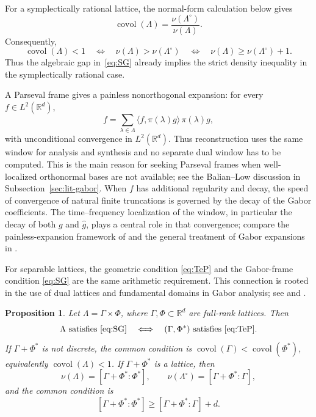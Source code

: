 \documentclass[11pt,reqno]{amsart}
\numberwithin{equation}{section}
\newtheorem{proposition}[theorem]{Proposition}
\theoremstyle{definition}
\theoremstyle{remark}
\newcommand{\R}{\mathbb R}
\newcommand{\covol}{\operatorname{covol}}
\newcommand{\ip}[2]{\langle #1,#2\rangle}
\begin{document}
For a symplectically rational lattice, the normal-form calculation below gives
\begin{equation}\label{eq:covol-nu-ratio-intro}
 \covol(\Lambda)=\frac{\nu(\Lambda^\circ)}{\nu(\Lambda)}.
\end{equation}
Consequently,
\[
 \covol(\Lambda)<1
 \quad\Longleftrightarrow\quad
 \nu(\Lambda)>\nu(\Lambda^\circ)
 \quad\Longleftrightarrow\quad
 \nu(\Lambda)\ge\nu(\Lambda^\circ)+1.
\]
Thus the algebraic gap in~\eqref{eq:SG} already implies the strict density
inequality in the symplectically rational case.

\medskip
A Parseval frame gives a painless nonorthogonal expansion: for every
$f\in L^2(\R^d)$,
\[
 f=\sum_{\lambda\in\Lambda}
     \ip{f}{\pi(\lambda)g}\,\pi(\lambda)g,
\]
with unconditional convergence in $L^2(\R^d)$.  Thus reconstruction uses
the same window for analysis and synthesis and no
separate dual window has to be computed.  This is the main reason for seeking Parseval frames when well-localized orthonormal bases are not available; see the Balian--Low discussion in Subsection~\ref{sec:lit-gabor}.  When $f$ has additional regularity and decay, the speed of
convergence of natural finite truncations is governed by the decay of the
Gabor coefficients.  The time--frequency localization of the window, in
particular the decay of both $g$ and $\widehat g$, plays a central role in
that convergence; compare the painless-expansion framework of
\cite{DaubechiesGrossmannMeyer1986} and the general treatment of Gabor
expansions in \cite[Chapters~5--7]{Grochenig2001}.
\medskip

For separable lattices, the geometric condition \eqref{eq:TeP} and the
Gabor-frame condition \eqref{eq:SG} are the same arithmetic requirement.
This connection is rooted in the use of dual lattices and fundamental
domains in Gabor analysis; see \cite{HanWang2001,PfanderRashkovWang2012}
and \cite[Chapters~7--8]{Grochenig2001}.

\begin{proposition}
\label{prop:TeP-SG-relation}
Let $\Lambda=\Gamma\times\Phi$, where $\Gamma,\Phi\subset\R^d$ are full-rank
lattices.  Then
\[
 \Lambda\text{ satisfies \eqref{eq:SG}}
 \quad\Longleftrightarrow\quad
 (\Gamma,\Phi^*)\text{ satisfies \eqref{eq:TeP}}.
\]
If $\Gamma+\Phi^*$ is not discrete, the common condition is
$\covol(\Gamma)<\covol(\Phi^*)$, equivalently
$\covol(\Lambda)<1$.  If $\Gamma+\Phi^*$ is a lattice, then
\[
 \nu(\Lambda)=[\Gamma+\Phi^*:\Phi^*],
 \qquad
 \nu(\Lambda^\circ)=[\Gamma+\Phi^*:\Gamma],
\]
and the common condition is
\[
 [\Gamma+\Phi^*:\Phi^*]\ge[\Gamma+\Phi^*:\Gamma]+d.
\]
\end{proposition}
\end{document}

